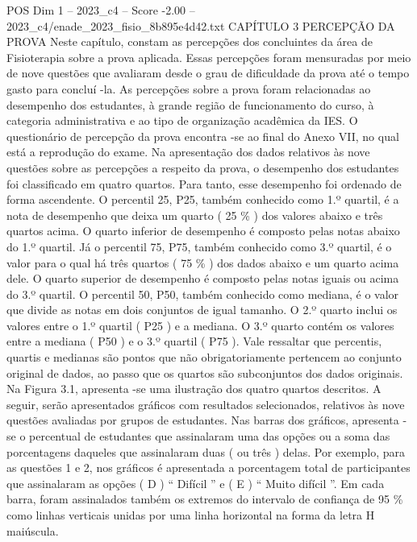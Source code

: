 \begin{textsample}{POS Dim 1 – 2023\_c4 – Score -2.00 – 2023\_c4/enade\_2023\_fisio\_8b895e4d42.txt}  \label{ex:f1_pos_199}
CAPÍTULO 3 PERCEPÇÃO DA PROVA Neste capítulo, constam as percepções dos concluintes da área de Fisioterapia sobre a prova aplicada.
Essas percepções foram mensuradas por meio de nove questões que avaliaram desde o grau de dificuldade da prova até o tempo gasto para concluí -la.
As percepções sobre a prova foram relacionadas ao desempenho dos estudantes, à grande região de funcionamento do curso, à categoria administrativa e ao tipo de organização acadêmica da IES.
O questionário de percepção da prova encontra -se ao final do Anexo VII, no qual está a reprodução do exame.
Na apresentação dos dados relativos às nove questões sobre as percepções a respeito da prova, o desempenho dos estudantes foi classificado em quatro quartos.
Para tanto, esse desempenho foi ordenado de forma ascendente.
O percentil 25, P25, também conhecido como 1.º quartil, é a nota de desempenho que deixa um quarto ( 25 \% ) dos valores abaixo e três quartos acima.
O quarto inferior de desempenho é composto pelas notas abaixo do 1.º quartil.
Já o percentil 75, P75, também conhecido como 3.º quartil, é o valor para o qual há três quartos ( 75 \% ) dos dados abaixo e um quarto acima dele.
O quarto superior de desempenho é composto pelas notas iguais ou acima do 3.º quartil.
O percentil 50, P50, também conhecido como mediana, é o valor que divide as notas em dois conjuntos de igual tamanho.
O 2.º quarto inclui os valores entre o 1.º quartil ( P25 ) e a mediana.
O 3.º quarto contém os valores entre a mediana ( P50 ) e o 3.º quartil ( P75 ).
Vale ressaltar que percentis, quartis e medianas são pontos que não obrigatoriamente pertencem ao conjunto original de dados, ao passo que os quartos são subconjuntos dos dados originais.
Na Figura 3.1, apresenta -se uma ilustração dos quatro quartos descritos.
A seguir, serão apresentados gráficos com resultados selecionados, relativos às nove questões avaliadas por grupos de estudantes.
Nas barras dos gráficos, apresenta -se o percentual de estudantes que assinalaram uma das opções ou a soma das porcentagens daqueles que assinalaram duas ( ou três ) delas.
Por exemplo, para as questões 1 e 2, nos gráficos é apresentada a porcentagem total de participantes que assinalaram as opções ( D ) “ Difícil ” e ( E ) “ Muito difícil ”.
Em cada barra, foram assinalados também os extremos do intervalo de confiança de 95 \% como linhas verticais unidas por uma linha horizontal na forma da letra H maiúscula.

\end{textsample}
